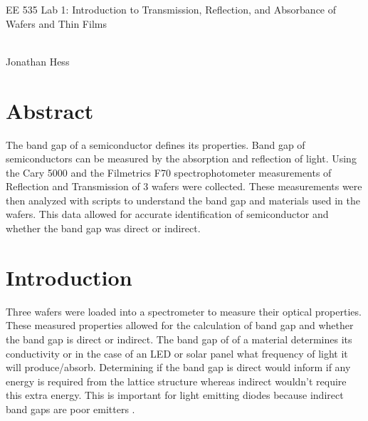 \documentclass[10pt,a4paper]{article}
\begin{document}
\newenvironment{indentPar}[1]%
 {\begin{list}{}%
         {\setlength{\leftmargin}{#1}}%
         \item[]%
 }
 {\end{list}}

\begin{flushleft}
\begin{LARGE}EE 535 Lab 1: Introduction to Transmission, Reflection, and Absorbance of Wafers and Thin Films
\end{LARGE}
\\Jonathan Hess
\end{flushleft}


\section*{Abstract}
\begin{indentPar}{1cm}
The band gap of a semiconductor defines its properties. Band gap of semiconductors can be measured by the absorption and reflection of light. Using the Cary 5000 and the Filmetrics F70 spectrophotometer measurements of Reflection and Transmission of 3 wafers were collected. These measurements were then analyzed with scripts to understand the band gap and materials used in the wafers. This data allowed for accurate identification of semiconductor and whether the band gap was direct or indirect.




\end{indentPar}


\section*{Introduction}
\begin{indentPar}{1cm}
Three wafers were loaded into a spectrometer to measure their optical properties. These measured properties allowed for the calculation of band gap and whether the band gap is direct or indirect. The band gap of of a material determines its conductivity or in the case of an LED or solar panel what frequency of light it will produce/absorb. Determining if the band gap is direct would inform if any energy is required from the lattice structure whereas indirect wouldn't require this extra energy. This is important for light emitting diodes because indirect band gaps are poor emitters \cite{Lasers}.

\end{indentPar}
\end{document}
